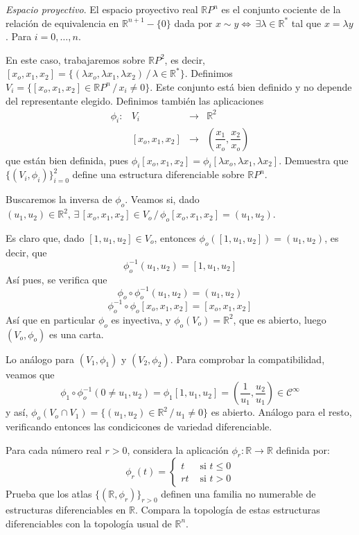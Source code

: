 \begin{ejer}
    [1.7] \textit{Espacio proyectivo}. El espacio proyectivo real $\mathbb RP^n$ es el conjunto cociente de la relaci\'on de equivalencia en $\mathbb R^{n+1} - \{0\}$ dada por $x \sim y \iff \, \exists \lambda \in \mathbb R^*$ tal que $x = \lambda y$. Para $i = 0,\ldots , n$. 
    
    En este caso, trabajaremos sobre $\mathbb RP^2$, es decir, $[x_o,x_1,x_2] = \{(\lambda x_o,\lambda x_1,\lambda x_2) \, / \, \lambda \in \mathbb R^*\}$. Definimos $V_i=\{[x_o,x_1,x_2] \in \mathbb RP^n \, / \, x_i \neq 0\}$. Este conjunto est\'a bien definido y no depende del representante elegido. Definimos tambi\'en las aplicaciones
    $$\begin{array}{rrcl}
        \phi_i: & V_i & \longrightarrow & \mathbb R^2  \\
         & [x_o,x_1,x_2] & \longrightarrow & \left( \dfrac{x_1}{x_o}, \dfrac{x_2}{x_o}\right) 
    \end{array}$$
    que est\'an bien definida, pues $\phi_i[x_o,x_1,x_2] = \phi_i[\lambda x_o,\lambda x_1,\lambda x_2]$. Demuestra que $\{(V_i, \phi_i)\}_{i=0}^2$ define una estructura diferenciable sobre $\mathbb RP^n$.
\end{ejer}
\begin{sol}
    Buscaremos la inversa de $\phi_o$. Veamos si, dado $(u_1,u_2) \in \mathbb R^2, \, \exists \, [x_o,x_1,x_2] \in V_o \, / \, \phi_o [x_o,x_1,x_2]=(u_1,u_2)$. 

    Es claro que, dado $[1,u_1,u_2] \in V_o$, entonces $\phi_o([1,u_1,u_2]) = (u_1,u_2)$, es decir, que 
    $$\phi_o^{-1}(u_1,u_2) = [1,u_1,u_2]$$
    As\'i pues, se verifica que 
    $$\phi_o \circ \phi_o^{-1}(u_1,u_2) = (u_1,u_2)$$
    $$\phi_o^{-1} \circ \phi_o[x_o,x_1,x_2] = [x_o,x_1,x_2]$$
    As\'i que en particular $\phi_o$ es inyectiva, y $\phi_o(V_o) = \mathbb R^2$, que es abierto, luego $(V_o, \phi_o)$ es una carta. 

    Lo an\'alogo para $(V_1, \phi_1)$ y $(V_2, \phi_2)$. Para comprobar la compatibilidad, veamos que 
    $$\phi_1 \circ \phi_o^{-1}(0 \neq u_1,u_2) = \phi_1[1,u_1,u_2] = \left(\dfrac{1}{u_1}, \dfrac{u_2}{u_1}\right) \in \mathcal{C}^{\infty}$$
    y as\'i, $\phi_o(V_o\cap V_1) = \{ (u_1,u_2) \in \mathbb R^2 \, /\, u_1 \neq 0\}$ es abierto. An\'alogo para el resto, verificando entonces las condicicones de variedad diferenciable.
\end{sol}
\begin{ejer} [1.11]
    Para cada n\'umero real $r > 0$, considera la aplicaci\'on $\phi_r : \mathbb R \to \mathbb R$ definida por:
$$\phi_r(t) = \begin{cases}
t & \text{ si } t \leq  0\\
rt & \text{ si } t > 0 
\end{cases}$$
Prueba que los atlas $\{(\mathbb R, \phi_r)\}_{r>0}$ definen una familia no numerable de estructuras diferenciables en $\mathbb R$. Compara la topolog\'ia de estas estructuras diferenciables con la topolog\'ia usual de $\mathbb R^n$.
\end{ejer}
